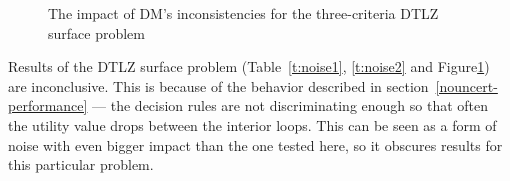 \begin{figure}
  \centering
  \caption{The impact of DM's inconsistencies for the three-criteria DTLZ
    surface problem}
  \label{c3_surface_noise}
\end{figure}

Results of the DTLZ surface problem (Table~\ref{t:noise1}, \ref{t:noise2} and
Figure\ref{c3_surface_noise}) are inconclusive. This is because of the behavior
described in section~\ref{nouncert-performance} --- the decision rules are not
discriminating enough so that often the utility value drops between the
interior loops. This can be seen as a form of noise with even bigger impact
than the one tested here, so it obscures results for this particular problem.

